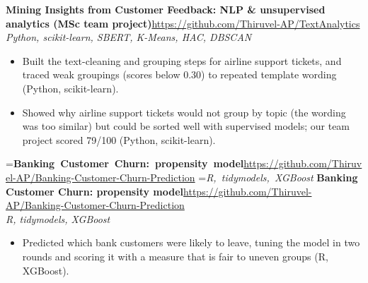 \documentclass[a4paper,11pt]{article}
\newcommand{\project}[3]{%
  \textbf{#1}\hfill#3\\ {\color{muted}\small\textit{#2}}\par}
\newcommand{\gap}{\vspace{5pt}}
\begin{document}
\ifdim\wd0>\linewidth
\ifdim\wd2>\linewidth
\textbf{Mining Insights from Customer Feedback: NLP \& unsupervised analytics (MSc team project)}\\ {\color{muted}\small\textit{Python, scikit-learn, SBERT, K-Means, HAC, DBSCAN}}\\ \hspace*{\fill}{\small\url{https://github.com/Thiruvel-AP/TextAnalytics}}\par
\else
\textbf{Mining Insights from Customer Feedback: NLP \& unsupervised analytics (MSc team project)}\\ {\color{muted}\small\textit{Python, scikit-learn, SBERT, K-Means, HAC, DBSCAN}}\hfill{\small\url{https://github.com/Thiruvel-AP/TextAnalytics}}\par
\fi
\else
\project{Mining Insights from Customer Feedback: NLP \& unsupervised analytics (MSc team project)}{Python, scikit-learn, SBERT, K-Means, HAC, DBSCAN}{\url{https://github.com/Thiruvel-AP/TextAnalytics}}
\fi
\begin{itemize}
  \item Built the text-cleaning and grouping steps for airline support tickets, and traced weak groupings (scores below 0.30) to repeated template wording (Python, scikit-learn).
  \item Showed why airline support tickets would not group by topic (the wording was too similar) but could be sorted well with supervised models; our team project scored 79/100 (Python, scikit-learn).
\end{itemize}
\gap
{}
=\hbox{\textbf{Banking Customer Churn: propensity model}\hspace{1em}\url{https://github.com/Thiruvel-AP/Banking-Customer-Churn-Prediction}}%
=\hbox{{\small\textit{R, tidymodels, XGBoost}}}%
\ifdim\wd0>\linewidth
\ifdim\wd2>\linewidth
\textbf{Banking Customer Churn: propensity model}\\ {\color{muted}\small\textit{R, tidymodels, XGBoost}}\\ \hspace*{\fill}{\small\url{https://github.com/Thiruvel-AP/Banking-Customer-Churn-Prediction}}\par
\else
\textbf{Banking Customer Churn: propensity model}\\ {\color{muted}\small\textit{R, tidymodels, XGBoost}}\hfill{\small\url{https://github.com/Thiruvel-AP/Banking-Customer-Churn-Prediction}}\par
\fi
\else
\project{Banking Customer Churn: propensity model}{R, tidymodels, XGBoost}{\url{https://github.com/Thiruvel-AP/Banking-Customer-Churn-Prediction}}
\fi
\begin{itemize}
  \item Predicted which bank customers were likely to leave, tuning the model in two rounds and scoring it with a measure that is fair to uneven groups (R, XGBoost).
\end{itemize}
\end{document}
